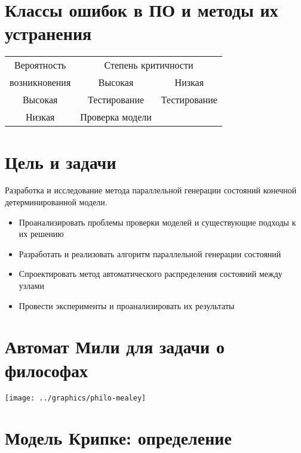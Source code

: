 \documentclass[12pt]{article}
\begin{document}
\TitleSlide

\section{Классы ошибок в ПО и методы их устранения}
\label{sec:error-classes}

\begin{center}
  \begin{tabular}{|c|c|c|} \hline Вероятность & \multicolumn{2}{|c|}{Степень критичности}
    \\ \cline{2-3} возникновения & Высокая & Низкая \\ \hline
    Высокая & Тестирование & Тестирование \\ \hline Низкая & Проверка модели & \\
    \hline
  \end{tabular}
\end{center}

\section{Цель и задачи}
\label{sec:goal-tasks}

Разработка и исследование метода параллельной генерации состояний конечной
детерминированной модели.

\small
\begin{itemize}
\item Проанализировать проблемы проверки моделей и существующие подходы к их решению
\item Разработать и реализовать алгоритм параллельной генерации состояний
\item Спроектировать метод автоматического распределения состояний между узлами
\item Провести эксперименты и проанализировать их результаты
\end{itemize}
\normalsize

\section{Автомат Мили для задачи о философах}
\label{sec:mealey}

\begin{center}
  \texttt{[image: ../graphics/philo-mealey]}
\end{center}

\section{Модель Крипке: определение}
\label{sec:kripke-def}
\end{document}
